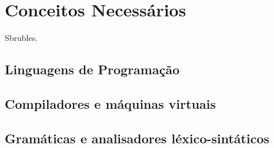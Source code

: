 
\chapter{Conceitos Necessários}
\label{sec:conceitos}

  Sbrubles.

  \section{Linguagens de Programação}
  \section{Compiladores e máquinas virtuais}
  \section{Gramáticas e analisadores léxico-sintáticos}

